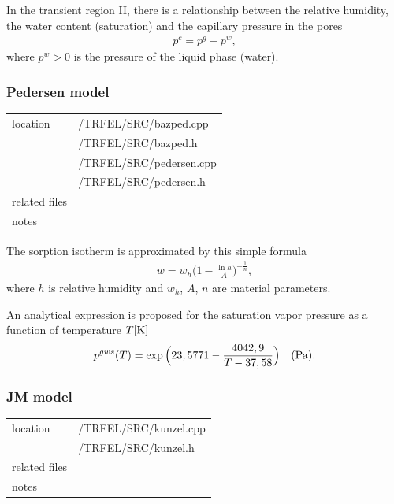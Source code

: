 In the transient region II, there is a relationship between the relative humidity, the water content (saturation) 
and the capillary pressure in the pores \cite{lewis}
\begin{eqnarray}\label{cap_press}
p^c = p^g - p^w,
\end{eqnarray}
where $p^w > 0$ is the pressure of the liquid phase (water). 

\subsubsection{Pedersen model}

\begin{center}
\begin{tabular}{|l|l|}
\hline
location & /TRFEL/SRC/bazped.cpp\\
         & /TRFEL/SRC/bazped.h\\
         & /TRFEL/SRC/pedersen.cpp\\
         & /TRFEL/SRC/pedersen.h
\\ \hline
related files &
\\ \hline
notes & 
\\ \hline
\end{tabular}
\end{center}

The sorption isotherm is approximated by this simple formula \cite{pedersen}
\begin{eqnarray}\label{sorption_isotherm}
w = w_h \Big(1 - \frac{\ln h}{A}\Big)^{-\frac{1}{n}},
\end{eqnarray}
where $h$ is relative humidity and $w_h$, $A$, $n$ are material parameters.

An analytical expression is proposed for the saturation vapor pressure as a function of temperature $T[{\rm K}]$ 
\begin{eqnarray}\label{saturation_pressure}
p^{gws}(T) = \exp \Big(23,5771 - \frac{4042,9}{T-37,58}\Big) \quad ({\rm Pa}).
\end{eqnarray}

\subsubsection{JM model}
\begin{center}
\begin{tabular}{|l|l|}
\hline
location & /TRFEL/SRC/kunzel.cpp\\
         & /TRFEL/SRC/kunzel.h
\\ \hline
related files &
\\ \hline
notes & 
\\ \hline
\end{tabular}
\end{center}
